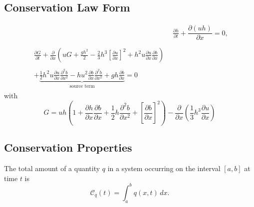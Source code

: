 \documentclass[times]{elsarticle}
\begin{document}
\subsection{Conservation Law Form}

\begin{subequations}
	\label{eqn:FullSerreCon}
	\begin{align}
	& \frac{\partial h}{\partial t} + \dfrac{\partial (uh)}{\partial x} = 0 ,\label{eqn:FullSerreConMass}  \\ \nonumber \\
	\begin{split}
	\label{eqn:Serreconsconmom}
	\frac{\partial G}{\partial t}  + \frac{\partial}{\partial x} \left( {u} G + \frac{gh^2}{2} - \frac{2}{3}h^3 \left[\frac{\partial {u}}{\partial x}\right]^2 + h^2 {u}\frac{\partial {u}}{\partial x}\frac{\partial b}{\partial x} \right) \\ \\ +  \underbrace{\frac{1}{2}h^2 {u} \frac{\partial {u}}{\partial x} \frac{\partial^2 b}{\partial x^2}  - h {u}^2\frac{\partial b}{\partial x}\frac{\partial^2 b}{\partial x^2} + gh\frac{\partial b}{\partial x} } _{\text{source term}} = 0
	\end{split}
	\end{align}
\end{subequations}
with
\begin{equation}
\label{defn:SerreEqnConservedQuantity1}
G =  {u}h \left(1 + \frac{\partial h}{\partial x}\frac{\partial b}{\partial x} + \frac{1}{2}h\frac{\partial^2 b}{\partial x^2} + \left[\frac{\partial b}{\partial x}\right]^2 \right) - \frac{\partial}{\partial x}\left(\frac{1}{3}h^3  \frac{\partial {u}}{\partial x}\right)
\end{equation}

\subsection{Conservation Properties}

The total amount of a quantity $q$ in a system occurring on the interval $[a,b]$ at time $t$ is
\begin{equation*}
\mathcal{C}_q(t) = \int_{a}^{b} q(x,t)\, dx.
\end{equation*}
\end{document}
